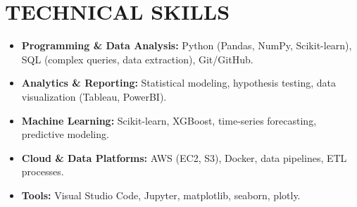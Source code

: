 \documentclass[a4paper,9pt]{extarticle}
\begin{document}
\section*{TECHNICAL SKILLS}

\begin{itemize}[leftmargin=0.5cm, label={}]
\item \textbf{Programming \& Data Analysis:} Python (Pandas, NumPy, Scikit-learn), SQL (complex queries, data extraction), Git/GitHub. \\

\item \textbf{Analytics \& Reporting:} Statistical modeling, hypothesis testing, data visualization (Tableau, PowerBI). \\

\item \textbf{Machine Learning:} Scikit-learn, XGBoost, time-series forecasting, predictive modeling. \\

\item \textbf{Cloud \& Data Platforms:} AWS (EC2, S3), Docker, data pipelines, ETL processes. \\

\item \textbf{Tools:} Visual Studio Code, Jupyter, matplotlib, seaborn, plotly. \\
\end{itemize}
\end{document}

